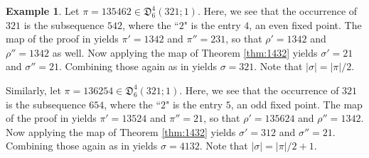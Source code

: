 \documentclass[
final
]{dmtcs-episciences}
\theoremstyle{definition}
\newtheorem{example}[theorem]{Example}
\theoremstyle{remark}
\begin{document}
\begin{example} 
Let $\pi = 135462 \in \mathfrak{D}^4_{6}(321;1)$.  Here, we see that the occurrence of $321$ is the subsequence $542$, where the ``$2$" is the entry $4$, an even fixed point. The map of the proof in \cite{Burstein_Short} yields $\pi'=1342$ and $\pi''=231$, so that $\rho'=1342$ and $\rho''=1342$ as well. Now applying the map of Theorem \ref{thm:1432} yields $\sigma'=21$ and $\sigma''=21$. Combining those again as in \cite{Burstein_Short} yields $\sigma=321$. Note that $|\sigma|=|\pi|/2$.

Similarly, let $\pi = 136254 \in \mathfrak{D}^4_{6}(321;1)$.  Here, we see that the occurrence of $321$ is the subsequence $654$, where the ``$2$" is the entry $5$, an odd fixed point. The map of the proof in \cite{Burstein_Short} yields $\pi'=13524$ and $\pi''=21$, so that $\rho'=135624$ and $\rho''=1342$. Now applying the map of Theorem \ref{thm:1432} yields $\sigma'=312$ and $\sigma''=21$. Combining those again as in \cite{Burstein_Short} yields $\sigma=4132$. Note that $|\sigma|=|\pi|/2+1$.
%
%
%
%
%
%
\end{example} 
\end{document}
